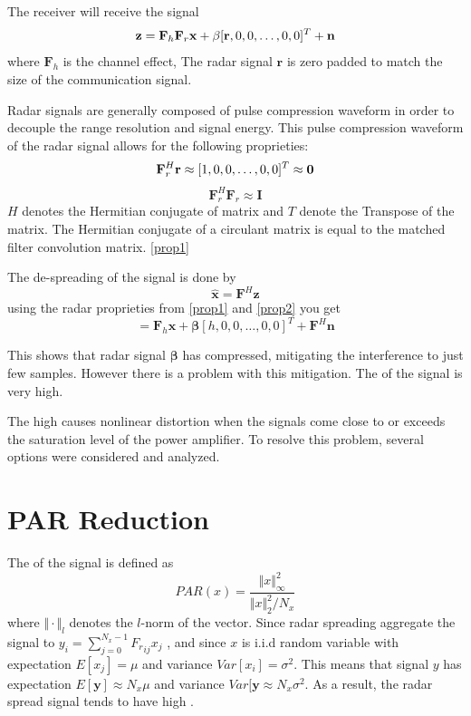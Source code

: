 \documentclass[conference]{IEEEtran}
\begin{document}
The receiver will receive the signal
\begin{equation}
\mathbf{z}=\mathbf{F}_h \mathbf{F}_r \mathbf{x} +\beta[\mathbf{r},0,0,\dots,0,0]^T +\mathbf{n}\\
\label{eq2}
\end{equation} 
where $\mathbf{F}_h$ is the channel effect, The radar signal $\mathbf{r}$ is zero padded to match the size of the communication signal.

Radar signals are generally composed of pulse compression waveform in order to decouple the range resolution and signal energy.  This pulse compression waveform of the radar signal allows for the following proprieties:
\begin{equation}
\mathbf{F}_r^H \mathbf{r} \approx [1,0,0,\dots,0,0]^T\approx\mathbf{0} \\
\label{prop1}
\end{equation}
\begin{equation}
\mathbf{F}_r^H \mathbf{F}_r \approx \mathbf{I}
\label{prop2}
\end{equation}
$H$ denotes the Hermitian conjugate of matrix and $T$ denote the Transpose of the matrix.  The Hermitian conjugate of a circulant matrix is equal to the matched filter convolution matrix. \eqref{prop1} 

The de-spreading of the signal is done by
\begin{equation}
\mathbf{\hat{x}}=\mathbf{F}^H\mathbf{z}
\end{equation}
using the radar proprieties from \eqref{prop1} and \eqref{prop2} you get
\begin{equation}
=\mathbf{F}_h\mathbf{x}+\boldsymbol{\beta}[h,0,0,\dots,0,0]^T+\mathbf{F}^H\mathbf{n}
\end{equation} 

This shows that radar signal $\boldsymbol{\beta}$ has compressed, mitigating the interference to just few samples.  However there is a problem with this mitigation.  The \PAR of the signal is very high.  

The high \PAR causes nonlinear distortion when the signals come close to or exceeds the saturation level of the power amplifier.  To resolve this problem, several options were considered and analyzed.

\section{PAR Reduction}
The \PAR of the signal is defined as
\begin{equation}
PAR(x)=\frac{\Vert x \Vert^2_\infty}{\Vert x \Vert^2_2/N_x}
\end{equation}
where $\Vert\cdot\Vert_l$ denotes the $l$-norm of the vector.  Since radar spreading aggregate the signal to $y_i=\sum_{j=0}^{N_x-1} {F_r}_{ij}x_j$ , and since $x$ is i.i.d random variable with expectation $E[x_j]=\mu$ and variance $Var[x_i]=\sigma^2$.  This means that signal $y$ has expectation $E[\mathbf{y}]\approx N_x\mu$ and variance $Var[\mathbf{y}\approx N_x\sigma^2$.  As a result, the radar spread signal tends to have high \PAR.
\end{document}
